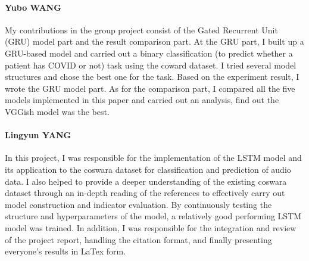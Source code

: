 \documentclass[11pt]{article}
\begin{document}
\paragraph{Yubo WANG}

My contributions in the group project consist of the Gated Recurrent Unit (GRU) model part 
and the result comparison part. At the GRU part, I built up a GRU-based model and carried out 
a binary classification (to predict whether a patient has COVID or not) task using the coward dataset. 
I tried several model structures and chose the best one for the task. 
Based on the experiment result, I wrote the GRU model part. As for the comparison part, 
I compared all the five models implemented in this paper and carried out an analysis, 
find out the VGGish model was the best.

\paragraph{Lingyun YANG}

In this project, I was responsible for the implementation of the LSTM model and 
its application to the coswara dataset for classification and prediction of audio data. 
I also helped to provide a deeper understanding of the existing coswara dataset 
through an in-depth reading of the references to effectively carry out model construction 
and indicator evaluation. By continuously testing the structure and hyperparameters of the model, 
a relatively good performing LSTM model was trained. In addition, I was responsible 
for the integration and review of the project report, handling the citation format, 
and finally presenting everyone's results in LaTex form.

\newpage

\end{document}
